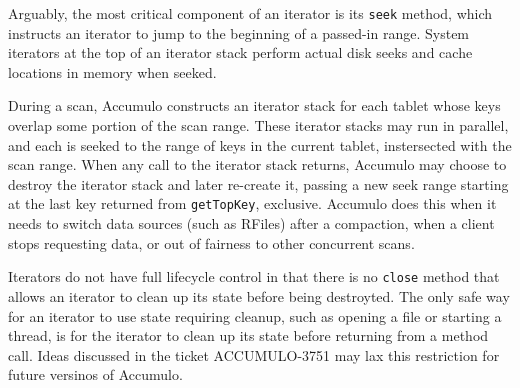 Arguably, the most critical component of an iterator is its \texttt{seek} method,
which instructs an iterator to jump to the beginning of a passed-in range. System iterators 
at the top of an iterator stack perform actual disk seeks and cache locations in memory when seeked.

During a scan, Accumulo constructs an iterator stack for each tablet whose keys overlap some portion 
of the scan range. These iterator stacks may run in parallel, and each is seeked to the range of 
keys in the current tablet, instersected with the scan range. When any call to the iterator stack 
returns, Accumulo may choose to destroy the iterator stack and later re-create it,
passing a new seek range starting at the last key returned from \texttt{getTopKey}, exclusive.
Accumulo does this when it needs to switch data sources (such as RFiles) after a compaction, 
when a client stops requesting data, or out of fairness to other concurrent scans.

Iterators do not have full lifecycle control in that there is no \texttt{close} method 
that allows an iterator to clean up its state before being destroyted. The only safe way for an 
iterator to use state requiring cleanup, such as opening a file or starting a thread,
is for the iterator to clean up its state before returning from a method call.
Ideas discussed in the ticket ACCUMULO-3751 may lax this restriction for future versinos of Accumulo.


